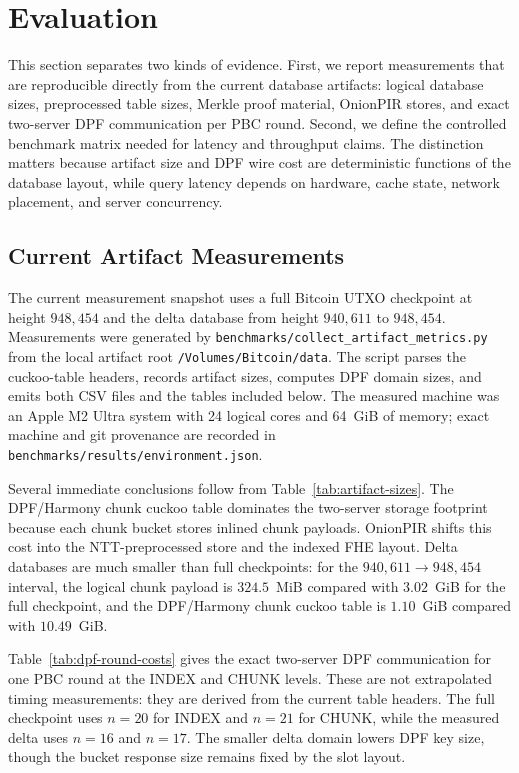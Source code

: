 \section{Evaluation}
\label{sec:evaluation}

This section separates two kinds of evidence. First, we report measurements that are reproducible directly from the current database artifacts: logical database sizes, preprocessed table sizes, Merkle proof material, OnionPIR stores, and exact two-server DPF communication per PBC round. Second, we define the controlled benchmark matrix needed for latency and throughput claims. The distinction matters because artifact size and DPF wire cost are deterministic functions of the database layout, while query latency depends on hardware, cache state, network placement, and server concurrency.

\subsection{Current Artifact Measurements}

The current measurement snapshot uses a full Bitcoin UTXO checkpoint at height $948{,}454$ and the delta database from height $940{,}611$ to $948{,}454$. Measurements were generated by \texttt{benchmarks/collect\_artifact\_metrics.py} from the local artifact root \texttt{/Volumes/Bitcoin/data}. The script parses the cuckoo-table headers, records artifact sizes, computes DPF domain sizes, and emits both CSV files and the tables included below. The measured machine was an Apple M2 Ultra system with 24 logical cores and 64~GiB of memory; exact machine and git provenance are recorded in \texttt{benchmarks/results/environment.json}.



Several immediate conclusions follow from Table~\ref{tab:artifact-sizes}. The DPF/Harmony chunk cuckoo table dominates the two-server storage footprint because each chunk bucket stores inlined chunk payloads. OnionPIR shifts this cost into the NTT-preprocessed store and the indexed FHE layout. Delta databases are much smaller than full checkpoints: for the $940{,}611 \to 948{,}454$ interval, the logical chunk payload is $324.5$~MiB compared with $3.02$~GiB for the full checkpoint, and the DPF/Harmony chunk cuckoo table is $1.10$~GiB compared with $10.49$~GiB.

Table~\ref{tab:dpf-round-costs} gives the exact two-server DPF communication for one PBC round at the INDEX and CHUNK levels. These are not extrapolated timing measurements: they are derived from the current table headers. The full checkpoint uses $n=20$ for INDEX and $n=21$ for CHUNK, while the measured delta uses $n=16$ and $n=17$. The smaller delta domain lowers DPF key size, though the bucket response size remains fixed by the slot layout.

